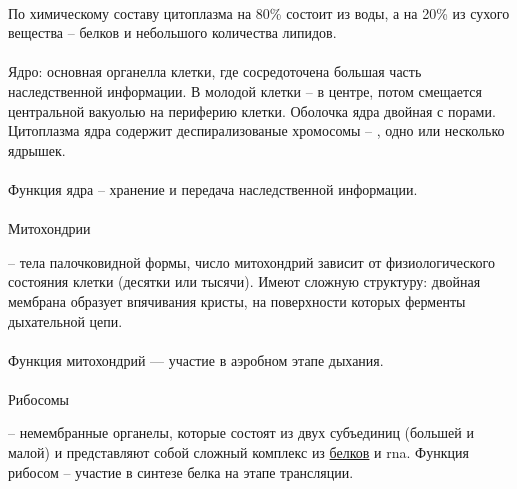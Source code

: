 \paragraph*{}По химическому составу цитоплазма на 80\% состоит из воды, а на 20\% из сухого вещества -- белков и небольшого количества липидов.

\paragraph*{}Ядро: основная органелла клетки, где сосредоточена большая часть наследственной информации. В молодой клетки -- в центре, потом смещается центральной вакуолью на периферию клетки. Оболочка ядра двойная с порами. Цитоплазма ядра  содержит деспирализованые хромосомы -- , одно или несколько ядрышек.

\paragraph*{}Функция ядра -- хранение и передача наследственной информации.

\paragraph*{}\hypertarget{mitohondria}{Митохондрии} -- тела палочковидной формы, число митохондрий зависит от физиологического состояния клетки (десятки или тысячи). Имеют сложную структуру: двойная мембрана образует впячивания кристы, на поверхности которых ферменты дыхательной цепи.

\paragraph*{}%

\paragraph*{}Функция митохондрий — участие в аэробном этапе дыхания.

\paragraph*{}\hypertarget{sect_rybosoms}{Рибосомы} -- немембранные органелы, которые состоят из двух субъединиц (большей и малой) и представляют собой сложный комплекс из \hyperlink{proteins}{белков} и \gls{rna}. Функция рибосом -- участие в синтезе белка на этапе трансляции.

